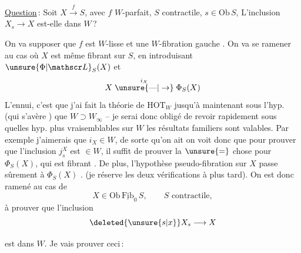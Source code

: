 \uline{Question}\,: Soit $X\xrightarrow{f}S$, avec $f$ $W$-parfait, $S$ contractile, $s\in\mathrm{Ob}\,S$, L'inclusion $X_s\to X$ est-elle dans $W$\,?


On va supposer  que $f$ est $W$-lisse et une $W$-fibration gauche . On va se ramener au cas où $X$ est même fibrant sur $S$, en introduisant $\unsure{\Phi|\mathscr L}_S(X)$ et
\[
X\mathrel{\overset{i_X}{\unsure{\text{---}|\to}}}\Phi_S(X)
\]
L'ennui, c'est que j'ai fait la théorie de $\mathrm{HOT}_W$ jusqu'à maintenant sous l'hyp. (qui s'avère ) que $W\supset W_\infty$ -- je serai donc obligé de revoir rapidement sous quelles hyp. plus vraisemblables sur $W$ les résultats familiers sont valables.  Par exemple j'aimerais que $i_X\in W$, de sorte qu'on ait
on voit donc que pour prouver que l'inclusion $j_s^X$ est $\in W$, il suffit de prouver la $\unsure{=}$ chose pour $\Phi_S(X)$, qui est fibrant . De plus, l'hypothèse pseudo-fibration sur $X$ passe sûrement à $\Phi_S(X)$ . (je réserve les deux vérifications à plus tard).
On est donc ramené au cas  de
\[
X\in\mathrm{Ob}\,\underline{\mathrm{Fib}}_0\, S,\qquad S\text{ contractile},
\]
à prouver que l'inclusion
\[
\deleted{\unsure{s|x}}X_s\longrightarrow X
\]


est dans $W$. Je vais prouver ceci\,:

